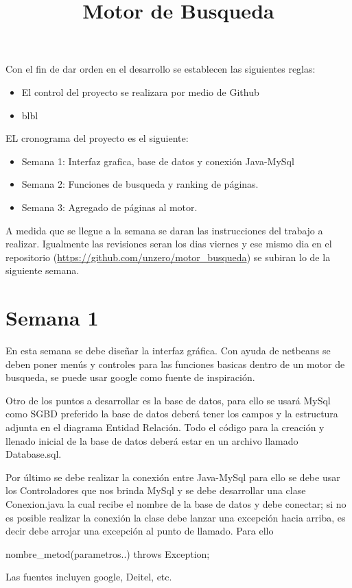 \documentclass[a4papper,10pt]{article}
\title{Motor de Busqueda}
\begin{document}
\maketitle

Con el fin de dar orden en el desarrollo se establecen las siguientes reglas:

\begin{itemize}
	\item El control del proyecto se realizara por medio de Github
	\item blbl
\end{itemize}

EL cronograma del proyecto es el siguiente:

\begin{itemize}
	\item Semana 1: Interfaz grafica, base de datos y conexi\'on Java-MySql	
	\item Semana 2: Funciones de busqueda y ranking de p\'aginas.
	\item Semana 3: Agregado de p\'aginas al motor.
\end{itemize}

A medida que se llegue a la semana se daran las instrucciones del trabajo a realizar. Igualmente las revisiones seran los dias viernes y ese mismo dia en el repositorio (\url{https://github.com/unzero/motor_busqueda}) se subiran lo de la siguiente semana.

\section{Semana 1}

En esta semana se debe dise\~nar la interfaz gr\'afica. Con ayuda de netbeans se deben poner men\'us y controles para las funciones basicas dentro de un motor de busqueda, se puede usar google como fuente de inspiraci\'on.

Otro de los puntos a desarrollar es la base de datos, para ello se usar\'a MySql como SGBD preferido la base de datos deber\'a tener los campos y la estructura adjunta en el diagrama Entidad Relaci\'on. Todo el c\'odigo para la creaci\'on y llenado inicial de la base de datos deber\'a estar en un archivo llamado Database.sql.

Por \'ultimo se debe realizar la conexi\'on entre Java-MySql para ello se debe usar los Controladores que nos brinda MySql y se debe desarrollar una clase Conexion.java la cual recibe el nombre de la base de datos y debe conectar; si no es posible realizar la conexi\'on la clase debe lanzar una excepci\'on hacia arriba, es decir debe arrojar una excepci\'on al punto de llamado. Para ello 


nombre\_metod(parametros..) throws Exception{};

Las fuentes incluyen google, Deitel, etc.
\end{document}
